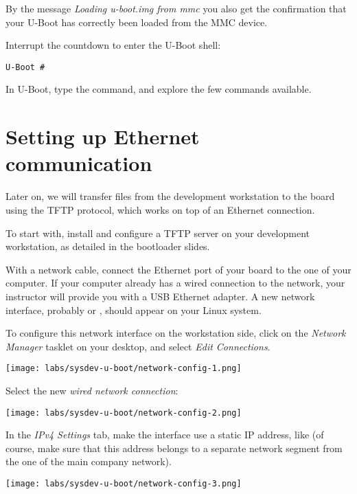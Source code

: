 By the message {\em Loading u-boot.img from mmc} you also get the
confirmation that your U-Boot has correctly been loaded from the MMC
device.

Interrupt the countdown to enter the U-Boot shell:
\begin{verbatim}
U-Boot #
\end{verbatim}

In U-Boot, type the  command, and explore the few commands available.

\section{Setting up Ethernet communication}

Later on, we will transfer files from the development workstation to
the board using the TFTP protocol, which works on top of an Ethernet
connection.

To start with, install and configure a TFTP server on your development
workstation, as detailed in the bootloader slides.

With a network cable, connect the Ethernet port of your board to the
one of your computer. If your computer already has a wired connection
to the network, your instructor will provide you with a USB Ethernet
adapter. A new network interface, probably  or ,
should appear on your Linux system.

To configure this network interface on the workstation side, click on
the {\em Network Manager} tasklet on your desktop, and select {\em
  Edit Connections}.

\begin{center}
\texttt{[image: labs/sysdev-u-boot/network-config-1.png]}
\end{center}

Select the new {\em wired network connection}:

\begin{center}
\texttt{[image: labs/sysdev-u-boot/network-config-2.png]}
\end{center}

In the {\em IPv4 Settings} tab, make the interface use a static IP
address, like  (of course, make sure that this
address belongs to a separate network segment from the one of the main
company network).

\begin{center}
\texttt{[image: labs/sysdev-u-boot/network-config-3.png]}
\end{center}

